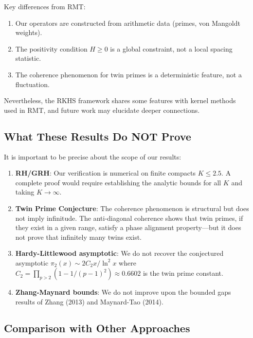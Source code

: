Key differences from RMT:
\begin{enumerate}
  \item Our operators are constructed from arithmetic data (primes, von Mangoldt weights).
  \item The positivity condition $H \geq 0$ is a global constraint, not a local spacing statistic.
  \item The coherence phenomenon for twin primes is a deterministic feature, not a fluctuation.
\end{enumerate}

Nevertheless, the RKHS framework shares some features with kernel methods used in RMT, and future work may elucidate deeper connections.

\subsection{What These Results Do NOT Prove}

It is important to be precise about the scope of our results:

\begin{enumerate}
  \item \textbf{RH/GRH}: Our verification is numerical on finite compacts $K \leq 2.5$. A complete proof would require establishing the analytic bounds for all $K$ and taking $K \to \infty$.

  \item \textbf{Twin Prime Conjecture}: The coherence phenomenon is structural but does not imply infinitude. The anti-diagonal coherence shows that twin primes, if they exist in a given range, satisfy a phase alignment property---but it does not prove that infinitely many twins exist.

  \item \textbf{Hardy-Littlewood asymptotic}: We do not recover the conjectured asymptotic $\pi_2(x) \sim 2C_2 x/\ln^2 x$ where $C_2 = \prod_{p > 2}(1 - 1/(p-1)^2) \approx 0.6602$ is the twin prime constant.

  \item \textbf{Zhang-Maynard bounds}: We do not improve upon the bounded gaps results of Zhang (2013) and Maynard-Tao (2014).
\end{enumerate}

\subsection{Comparison with Other Approaches}

